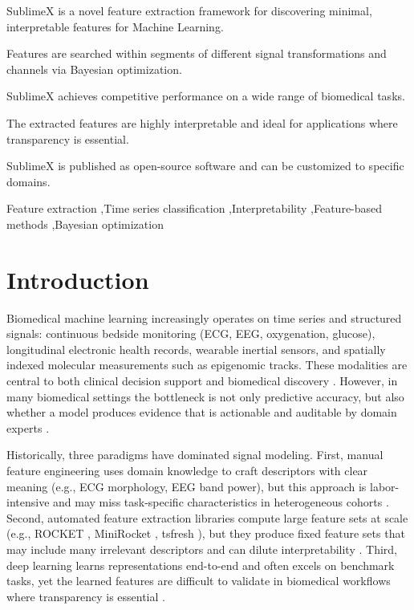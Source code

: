 \documentclass[times, review, 10pt]{elsarticle}
\begin{document}
\begin{frontmatter}
\begin{highlights}
\item SublimeX is a novel feature extraction framework for discovering minimal, interpretable features for Machine Learning.
\item Features are searched within segments of different signal transformations and channels via Bayesian optimization.
\item SublimeX achieves competitive performance on a wide range of biomedical tasks.
\item The extracted features are highly interpretable and ideal for applications where transparency is essential.
\item SublimeX is published as open-source software and can be customized to specific domains.
\end{highlights}

\begin{keyword}
Feature extraction \sep Time series classification \sep Interpretability
\sep Feature-based methods \sep Bayesian optimization

\end{keyword}

\end{frontmatter}


\section{Introduction}
Biomedical machine learning increasingly operates on time series and structured signals: continuous bedside monitoring (ECG, EEG, oxygenation, glucose),
longitudinal electronic health records, wearable inertial sensors, and spatially indexed molecular measurements such as epigenomic tracks.
These modalities are central to both clinical decision support and biomedical discovery \cite{morid2023time, patharkar2024predictive}.
However, in many biomedical settings the bottleneck is not only predictive accuracy, but also whether a model produces evidence that is actionable and
auditable by domain experts \cite{tonekaboni2019clinicians, rudin2019stop}.

Historically, three paradigms have dominated signal modeling. First, manual feature engineering uses domain knowledge to craft descriptors
with clear meaning (e.g., ECG morphology, EEG band power), but this approach is labor-intensive and may miss task-specific characteristics in heterogeneous cohorts \cite{fulcher2018feature, miotto2018deep}.
Second, automated feature extraction libraries compute large feature sets at scale (e.g., ROCKET \cite{dempster2020rocket}, MiniRocket \cite{dempster2021minirocket}, tsfresh \cite{christ2018tsfresh}), 
but they produce fixed feature sets that may include many irrelevant descriptors and can dilute interpretability \cite{henderson2021empirical}.
Third, deep learning learns representations end-to-end and often excels on benchmark tasks, yet the learned features are difficult to validate in
biomedical workflows where transparency is essential \cite{miotto2018deep, wang2022systematic}.
\end{document}
